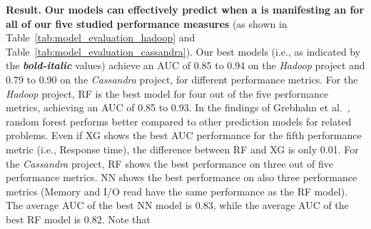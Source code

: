 \noindent \textbf{Result.}
\noindent \textbf{Our models can effectively predict when a \instance is manifesting an \inconsistent for all of our five studied performance measures} (as shown in Table~\ref{tab:model_evaluation_hadoop} 
and Table~\ref{tab:model_evaluation_cassandra}). 
Our best models (i.e., as indicated by the \textbf{\textit{bold-italic}} values) achieve an AUC of 0.85 to 0.94 on the \emph{Hadoop} project and 0.79 to 0.90 on the \emph{Cassandra} project, for different performance metrics.
For the \emph{Hadoop} project, %
RF is the best model for four out of the five performance metrics, achieving an AUC of 0.85 to 0.93. In the findings of Grebhahn et al.~\cite{grebhahn2019predicting}, random forest performs better compared to other prediction models for related problems. Even if XG shows the best AUC performance for the fifth performance metric (i.e., Response time), the difference between RF and XG is only 0.01. 
For the \emph{Cassandra} project, RF shows the best performance on three out of five performance metrics. NN shows the best performance on also three performance metrics (Memory and I/O read have the same performance as the RF model). The average AUC of the best NN model is 0.83, while the average AUC of the best RF model is 0.82. 
Note that %
